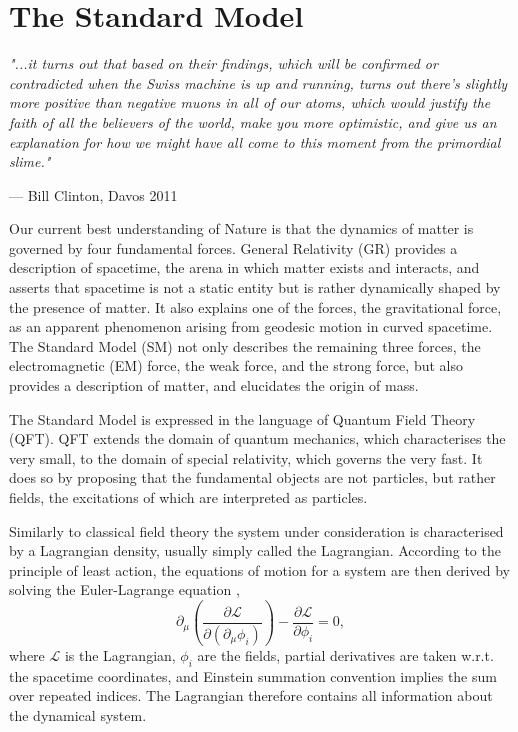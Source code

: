 \chapter{The Standard Model}

\textit{"...it turns out that based on their findings, which will be confirmed
or contradicted when the Swiss machine is up and running, turns out there's
slightly more positive than negative muons in all of our atoms, which would
justify the faith of all the believers of the world, make you more
optimistic, and give us an explanation for how we might have all come to this
moment from the primordial slime."}
\vspace{5mm}
\begin{flushright}
--- Bill Clinton, Davos 2011
\end{flushright}

\thispagestyle{empty}
\newpage

\noindent
Our current best understanding of Nature is that the dynamics of matter is governed
by four fundamental forces. General Relativity (GR) provides a
description of spacetime, the arena in which matter exists and interacts, and asserts
that spacetime is not a static entity but is rather dynamically shaped by the presence
of matter. It also explains one of the forces, the gravitational force, as an apparent
phenomenon arising from geodesic motion in curved spacetime. The Standard Model
(SM) not only describes the remaining three forces, the electromagnetic (EM) force,
the weak force, and the strong force, but also provides a description of matter, and 
elucidates the origin of mass.

The Standard Model is expressed in the language of Quantum Field Theory (QFT). QFT 
extends the domain of quantum mechanics, which characterises the very small, to
the domain of special relativity, which governs the very fast. It does so by
proposing that the fundamental objects are not particles, but rather fields, the
excitations of which are interpreted as particles.

Similarly to classical field theory the system under consideration is characterised
by a Lagrangian density, usually simply called the Lagrangian. According to
the principle of least action, the equations of motion for a system are then derived
by solving the Euler-Lagrange equation \cite{Thomson:2013zua},
\begin{equation}
\partial_\mu \left(\frac{\partial \mathcal{L}}{\partial(\partial_\mu \phi_i)}\right)
- \frac{\partial{\mathcal{L}}}{\partial \phi_i} = 0,
\end{equation}
where $\mathcal{L}$ is the Lagrangian, $\phi_i$ are the fields, partial derivatives
are taken w.r.t. the spacetime coordinates, and Einstein summation convention implies
the sum over repeated indices. The Lagrangian therefore contains all
information about the dynamical system. 

